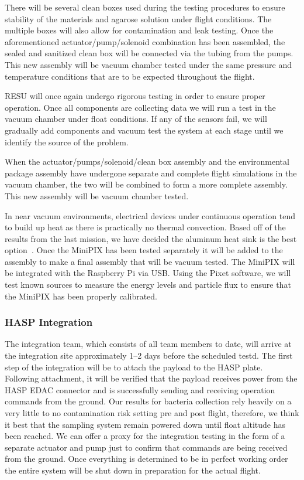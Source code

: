 There will be several clean boxes used during the testing procedures to ensure stability of the materials and agarose solution under flight conditions. The multiple boxes will also allow for contamination and leak testing. Once the aforementioned actuator/pump/solenoid combination has been assembled, the sealed and sanitized clean box will be connected via the tubing from the pumps. This new assembly will be vacuum chamber tested under the same pressure and temperature conditions that are to be expected throughout the flight. 

RESU will once again undergo rigorous testing in order to ensure proper operation. Once all components are collecting data we will run a test in the vacuum chamber under float conditions. If any of the sensors fail, we will gradually add components and vacuum test the system at each stage until we identify the source of the problem.

When the actuator/pumps/solenoid/clean box assembly and the environmental package assembly have undergone separate and complete flight simulations in the vacuum chamber, the two will be combined to form a more complete assembly. This new assembly will be vacuum chamber tested. 

In near vacuum environments, electrical devices under continuous operation tend to build up heat as there is practically no thermal convection. Based off of the results from the last mission, we have decided the aluminum heat sink is the best option~\cite{SORA}. Once the MiniPIX has been tested separately it will be added to the assembly to make a final assembly that will be vacuum tested. The MiniPIX will be integrated with the Raspberry Pi via USB. Using the Pixet software, we will test known sources to measure the energy levels and particle flux to ensure that the MiniPIX has been properly calibrated.
    

\subsubsection{HASP Integration}
The integration team, which consists of all team members to date, will arrive at the integration site approximately \numrange{1}{2} days before the scheduled testd. The first step of the integration will be to attach the payload to the HASP plate. Following attachment, it will be verified that the payload receives power from the HASP EDAC connector and is successfully sending and receiving operation commands from the ground. Our results for bacteria collection rely heavily on a very little to no contamination risk setting pre and post flight, therefore, we think it best that the sampling system remain powered down until float altitude has been reached. We can offer a proxy for the integration testing in the form of a separate actuator and pump just to confirm that commands are being received from the ground. Once everything is determined to be in perfect working order the entire system will be shut down in preparation for the actual flight.

